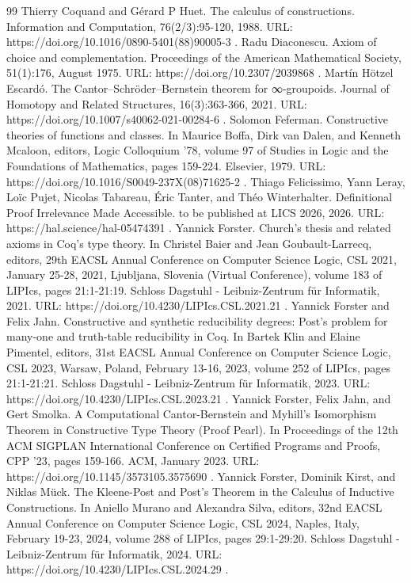 \begin{thebibliography}{99}
 Thierry Coquand and Gérard P Huet. The calculus of constructions. Information and Computation, 76(2/3):95-120, 1988. URL: https://doi.org/10.1016/0890-5401(88)90005-3 .
 Radu Diaconescu. Axiom of choice and complementation. Proceedings of the American Mathematical Society, 51(1):176, August 1975. URL: https://doi.org/10.2307/2039868 .
 Martín Hötzel Escardó. The Cantor–Schröder–Bernstein theorem for ∞-groupoids. Journal of Homotopy and Related Structures, 16(3):363-366, 2021. URL: https://doi.org/10.1007/s40062-021-00284-6 .
 Solomon Feferman. Constructive theories of functions and classes. In Maurice Boffa, Dirk van Dalen, and Kenneth Mcaloon, editors, Logic Colloquium '78, volume 97 of Studies in Logic and the Foundations of Mathematics, pages 159-224. Elsevier, 1979. URL: https://doi.org/10.1016/S0049-237X(08)71625-2 .
 Thiago Felicissimo, Yann Leray, Loïc Pujet, Nicolas Tabareau, Éric Tanter, and Théo Winterhalter. Definitional Proof Irrelevance Made Accessible. to be published at LICS 2026, 2026. URL: https://hal.science/hal-05474391 .
 Yannick Forster. Church’s thesis and related axioms in Coq’s type theory. In Christel Baier and Jean Goubault-Larrecq, editors, 29th EACSL Annual Conference on Computer Science Logic, CSL 2021, January 25-28, 2021, Ljubljana, Slovenia (Virtual Conference), volume 183 of LIPIcs, pages 21:1-21:19. Schloss Dagstuhl - Leibniz-Zentrum für Informatik, 2021. URL: https://doi.org/10.4230/LIPIcs.CSL.2021.21 .
 Yannick Forster and Felix Jahn. Constructive and synthetic reducibility degrees: Post’s problem for many-one and truth-table reducibility in Coq. In Bartek Klin and Elaine Pimentel, editors, 31st EACSL Annual Conference on Computer Science Logic, CSL 2023, Warsaw, Poland, February 13-16, 2023, volume 252 of LIPIcs, pages 21:1-21:21. Schloss Dagstuhl - Leibniz-Zentrum für Informatik, 2023. URL: https://doi.org/10.4230/LIPIcs.CSL.2023.21 .
 Yannick Forster, Felix Jahn, and Gert Smolka. A Computational Cantor-Bernstein and Myhill’s Isomorphism Theorem in Constructive Type Theory (Proof Pearl). In Proceedings of the 12th ACM SIGPLAN International Conference on Certified Programs and Proofs, CPP ’23, pages 159-166. ACM, January 2023. URL: https://doi.org/10.1145/3573105.3575690 .
 Yannick Forster, Dominik Kirst, and Niklas Mück. The Kleene-Post and Post’s Theorem in the Calculus of Inductive Constructions. In Aniello Murano and Alexandra Silva, editors, 32nd EACSL Annual Conference on Computer Science Logic, CSL 2024, Naples, Italy, February 19-23, 2024, volume 288 of LIPIcs, pages 29:1-29:20. Schloss Dagstuhl - Leibniz-Zentrum für Informatik, 2024. URL: https://doi.org/10.4230/LIPIcs.CSL.2024.29 .

\end{thebibliography}
